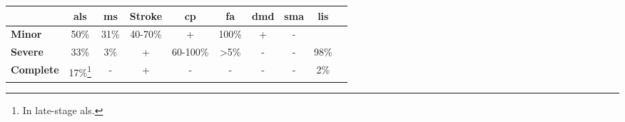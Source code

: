 \small
\sffamily
\begin{tabularx}{\textwidth}{@{}Xccccccccc@{}}
\toprule
    & \bfseries \acs{als} & \bfseries \acs{ms}   & \bfseries Stroke
    & \bfseries \acs{cp} & \bfseries\acs{fa} & \bfseries \acs{dmd} & \bfseries \acs{sma} & \bfseries \acs{lis} \\ \midrule
    \bfseries Minor    & 50\% & 31\% & 40-70\% & + & 100\% & + & - &      \\
    \bfseries Severe   & 33\% & 3\%  & +       & 60-100\% & >5\% &  - & - & 98\% \\
    \bfseries Complete & 17\%\footnote{In late-stage \ac{als}.} & -    & +
    & -&- & - & - & 2\%  \\
\bottomrule
\end{tabularx}
